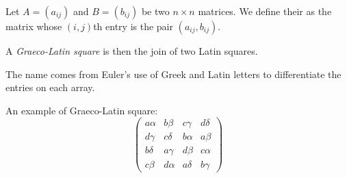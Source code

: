 \documentclass{article}
\begin{document}
Let $A=(a_{ij})$ and $B=(b_{ij})$ be two $n\times n$ matrices. We define their \emph{} as the matrix whose $(i,j)$th entry is the pair $(a_{ij},b_{ij})$.

A \emph{Graeco-Latin square} is then the join of two Latin squares.

The name comes from Euler's use of Greek and Latin letters to differentiate the entries on each array.

An example of Graeco-Latin square:
\begin{equation*}
\begin{pmatrix}
a\alpha & b\beta & c\gamma & d\delta\\
d\gamma & c\delta & b\alpha & a\beta\\
b\delta & a\gamma & d\beta &  c\alpha\\
c\beta & d\alpha & a\delta & b\gamma
\end{pmatrix}
\end{equation*}
\end{document}
